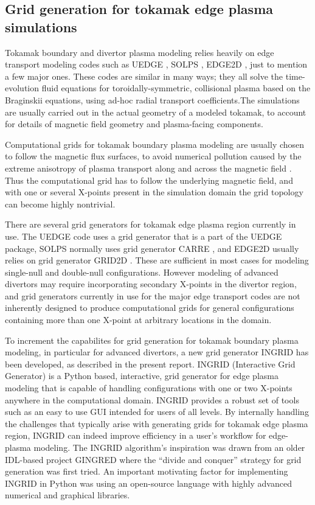\subsection{Grid generation for tokamak edge plasma simulations}

Tokamak boundary and divertor plasma modeling relies heavily on edge
transport modeling codes such as UEDGE \cite{Rognlien1999}, SOLPS
\cite{Wiesen2015}, EDGE2D \cite{Simonini1994}, just to mention a few
major ones. These codes are similar in many ways; they all solve the
time-evolution fluid equations for toroidally-symmetric, collisional
plasma based on the Braginskii equations, using ad-hoc radial
transport coefficients.The simulations are usually carried out in the
actual geometry of a modeled tokamak, to account for details of
magnetic field geometry and plasma-facing components.

Computational grids for tokamak boundary plasma modeling are usually
chosen to follow the magnetic flux surfaces, to avoid numerical
pollution caused by the extreme anisotropy of plasma transport along
and across the magnetic field \cite{Umansky2005}. Thus the
computational grid has to follow the underlying magnetic field, and
with one or several X-points present in the simulation domain the grid
topology can become highly nontrivial.

There are several grid generators for tokamak edge plasma region
currently in use. The UEDGE code uses a grid generator that is a part
of the UEDGE package, SOLPS normally uses grid generator CARRE
\cite{Marchand1996}, and EDGE2D usually relies on grid generator GRID2D
\cite{Taroni1992}. These are sufficient in most cases for modeling
single-null and double-null configurations. However modeling of
advanced divertors may require incorporating secondary X-points in the
divertor region, and grid generators currently in use for the major
edge transport codes are not inherently designed to produce
computational grids for general configurations containing more than
one X-point at arbitrary locations in the domain.

To increment the capabilites for grid generation for tokamak boundary
plasma modeling, in particular for advanced divertors, a new grid
generator INGRID has been developed, as described in the present
report.  INGRID (Interactive Grid Generator) is a Python based,
interactive, grid generator for edge plasma modeling that is capable
of handling configurations with one or two X-points anywhere in the
computational domain. INGRID provides a robust set of tools such as an
easy to use GUI intended for users of all levels. By internally
handling the challenges that typically arise with generating grids for
tokamak edge plasma region, INGRID can indeed improve efficiency in a
user's workflow for edge-plasma modeling. The INGRID algorithm's
inspiration was drawn from an older IDL-based project GINGRED
\cite{Izacard2017} where the ``divide and conquer'' strategy for
grid generation was first tried. An important motivating factor for
implementing INGRID in Python was using an open-source language with
highly advanced numerical and graphical libraries.


